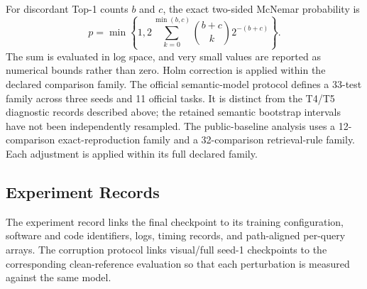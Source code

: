 \documentclass[journal]{IEEEtran}
\begin{document}
For discordant Top-1 counts $b$ and $c$, the exact two-sided McNemar
probability is
\begin{equation}
  p=\min\!\left\{1,
    2\sum_{k=0}^{\min(b,c)}\binom{b+c}{k}2^{-(b+c)}\right\}.
\end{equation}
The sum is evaluated in log space, and very small values are reported as
numerical bounds rather than zero. Holm correction is applied within the
declared comparison family. The official semantic-model protocol defines a 33-test family
across three seeds and 11 official tasks. It is distinct from the T4/T5
diagnostic records described above; the retained semantic bootstrap
intervals have not been independently resampled. The public-baseline analysis uses a 12-comparison
exact-reproduction family and a 32-comparison retrieval-rule family. Each
adjustment is applied within its full declared family.

\subsection{Experiment Records}

The experiment record links the final checkpoint to its training
configuration, software and code identifiers, logs, timing records, and
path-aligned per-query arrays. The corruption protocol links visual/full
seed-1 checkpoints to the corresponding clean-reference evaluation so that
each perturbation is measured against the same model.

\FloatBarrier


\end{document}
